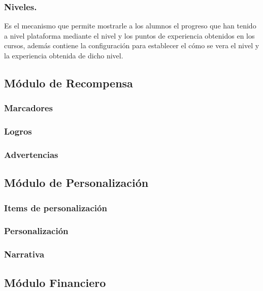 \subsubsection{Niveles.}

 Es el mecanismo que permite mostrarle a los alumnos el progreso que han tenido
 a nivel plataforma mediante el nivel y los puntos de experiencia obtenidos en
 los cursos, además contiene la configuración para establecer el cómo se vera el
 nivel y la experiencia obtenida de dicho nivel.


\subsection{Módulo de Recompensa}

\subsubsection{Marcadores}
\subsubsection{Logros}
\subsubsection{Advertencias}

\subsection{Módulo de Personalización}

\subsubsection{Items de personalización}
\subsubsection{Personalización}
\subsubsection{Narrativa}

\subsection{Módulo Financiero}


